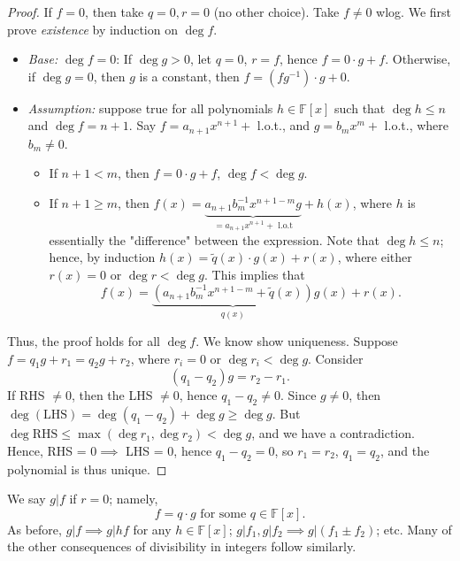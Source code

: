 \documentclass[12pt,oneside]{article}
\begin{document}
\begin{proof}
  If $f = 0$, then take $q = 0, r = 0$ (no other choice). Take $f \neq 0$ wlog. We first prove \textit{existence} by induction on $\deg f$. 
  \begin{itemize}
    \item \textit{Base:} $\deg f = 0$: If $\deg g > 0$, let $q = 0$, $r =f$, hence $f = 0 \cdot g + f$. Otherwise, if $\deg g = 0$, then $g$ is a constant, then $f = (f g^{-1}) \cdot g + 0$.
    \item \textit{Assumption:} suppose true for all polynomials $h \in \mathbb{F}[x]$ such that $\deg h \leq n$ and $\deg f = n+1$.  Say $f = a_{n+1}x^{n+1} + $ l.o.t.\footnotemark, and $g = b_{m} x^{m} + $ l.o.t., where $b_m \neq 0$. 
    \begin{itemize}
      \item If $n+1 < m$, then $f = 0 \cdot g + f$, $\deg f < \deg g$.
      \item If $n + 1 \geq m$, then $f(x) = \underbrace{a_{n+1} b_{m}^{-1} x^{n+1-m} g}_{=a_{n+1}x^{n+1} + \text{ l.o.t}} + h(x)$, where $h$ is essentially the "difference" between the expression. Note that $\deg h \leq n$; hence, by induction $h(x) = \tilde{q}(x)\cdot g(x) + r(x)$, where either $r(x) = 0$ or $\deg r < \deg g$. This implies that $$f(x) = \underbrace{(a_{n+1} b_m^{-1} x^{n+1-m} + \tilde{q}(x))}_{q(x)} g(x) + r(x).$$
    \end{itemize}
  \end{itemize}
  Thus, the proof holds for all $\deg f$. We know show uniqueness. Suppose $f = q_1 g + r_1 = q_2 g + r_2$, where $r_i = 0$ or $\deg r_i < \deg g$. Consider \[(q_1 - q_2)g = r_2 - r_1.\] If RHS $\neq 0$, then the LHS $\neq 0$, hence $q_1 - q_2 \neq 0$. Since $g \neq 0$, then $\deg( \text{LHS}) = \deg (q_1 - q_2) + \deg g \geq \deg g$. But $\deg \text{RHS} \leq \max (\deg r_1, \deg r_2) < \deg g$, and we have a contradiction. Hence, RHS = $0 \implies $ LHS = 0, hence $q_1 - q_2 = 0$, so $r_1 = r_2$, $q_1 = q_2$, and the polynomial is thus unique.
\end{proof}


\begin{definition}[Divisibility]
  We say $g | f$ if $r = 0$; namely,
  \[f = q \cdot g \text{ for some } q \in \mathbb{F}[x].\] As before, $g | f \implies g | hf$ for any $h \in \mathbb{F}[x]$; $g | f_1, g|f_2 \implies g | (f_1 \pm f_2)$; etc. Many of the other consequences of divisibility in integers follow similarly.
\end{definition}
\end{document}
